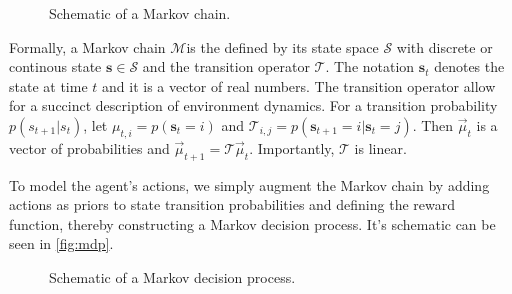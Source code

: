 \begin{figure}[htpb]
\begin{center}
\end{center}
\caption{Schematic of a Markov chain.}
\label{fig:markov-chain}
\end{figure}

Formally, a Markov chain $ \mathcal{M}  $is the defined by its state space
$ \mathcal{S}  $ with discrete or continous state $ \bm{s} \in \mathcal{S}  $
and the transition operator $ \mathcal{T}  $.
The notation $ \bm{s}_{ t }  $ denotes the state at time $ t  $ and it is a vector of real numbers.
The transition operator allow for a succinct description of environment dynamics.
For a transition probability $ p(s_{ t+1 }|s_{ t })  $,
let $ \mu_{ t,i } = p (\bm{s}_{t} = i)  $ and
$ \mathcal{T}_{ i,j } = p (\bm{s}_{t+1} = i|\bm{s}_{t} = j )  $.
Then $\overrightarrow{\mu}_t$ is a vector of probabilities and 
$\overrightarrow{\mu}_{t+1} = \mathcal{T} \overrightarrow{\mu}_t$.
Importantly, $ \mathcal{T}  $ is linear.

To model the agent's actions, we simply augment the Markov chain by adding
actions as priors to state transition probabilities and defining the reward function, 
thereby constructing a Markov decision process.
It's schematic can be seen in \ref{fig:mdp}.
\begin{figure}[htpb]
\begin{center}
\end{center}
\caption{Schematic of a Markov decision process.}
\label{fig:markov-chain}
\end{figure}

